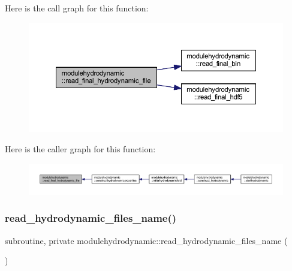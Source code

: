 Here is the call graph for this function\+:\nopagebreak
\begin{figure}[H]
\begin{center}
\leavevmode
\includegraphics[width=350pt]{namespacemodulehydrodynamic_aac2dc91eeafc8e79ef7e6399aca89537_cgraph}
\end{center}
\end{figure}
Here is the caller graph for this function\+:\nopagebreak
\begin{figure}[H]
\begin{center}
\leavevmode
\includegraphics[width=350pt]{namespacemodulehydrodynamic_aac2dc91eeafc8e79ef7e6399aca89537_icgraph}
\end{center}
\end{figure}
\mbox{\label{namespacemodulehydrodynamic_a38cc357414f891bddecb56ab805ed45b}} 
\subsubsection{\texorpdfstring{read\+\_\+hydrodynamic\+\_\+files\+\_\+name()}{read\_hydrodynamic\_files\_name()}}
{\footnotesize\ttfamily subroutine, private modulehydrodynamic\+::read\+\_\+hydrodynamic\+\_\+files\+\_\+name (\begin{DoxyParamCaption}{ }\end{DoxyParamCaption})\hspace{0.3cm}{\ttfamily [private]}}

